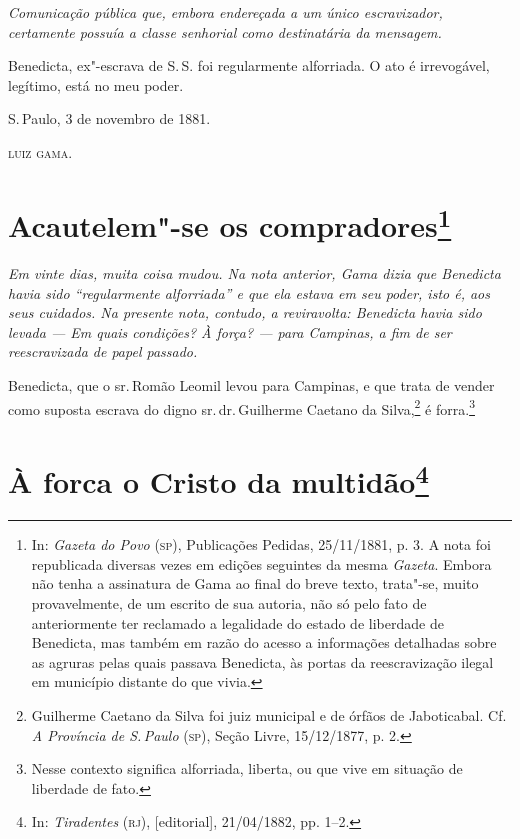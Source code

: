\begin{flushleft}
{\footnotesize\itshape
Comunicação pública que, embora endereçada a um único
escravizador, certamente possuía a classe senhorial como destinatária da
mensagem.}
\end{flushleft}

Benedicta, ex"-escrava de S.\,S. foi regularmente alforriada. O ato é
irrevogável, legítimo, está no meu poder.

S.\,Paulo, 3 de novembro de 1881.

\textsc{luiz gama.}


\chapter{Acautelem"-se os compradores\footnote[*]{In: \emph{Gazeta do Povo} (\textsc{sp}), Publicações
  Pedidas, 25/11/1881, p. 3. A nota foi republicada diversas vezes em
  edições seguintes da mesma \emph{Gazeta}. Embora não tenha a
  assinatura de Gama ao final do breve texto, trata"-se, muito
  provavelmente, de um escrito de sua autoria, não só pelo fato de
  anteriormente ter reclamado a legalidade do estado de liberdade de
  Benedicta, mas também em razão do acesso a informações detalhadas
  sobre as agruras pelas quais passava Benedicta, às portas da
  reescravização ilegal em município distante do que vivia.}}

\begin{flushleft}
{\footnotesize\itshape
Em vinte dias, muita coisa mudou. Na nota anterior, Gama dizia que
Benedicta havia sido ``regularmente alforriada'' e que ela estava em seu
poder, isto é, aos seus cuidados. Na presente nota, contudo, a
reviravolta: Benedicta havia sido levada --- Em quais condições? À força?
--- para Campinas, a fim de ser reescravizada de papel passado.}
\end{flushleft}

Benedicta, que o sr.\,Romão Leomil levou para Campinas, e que trata de
vender como suposta escrava do digno sr.\,dr.\,Guilherme Caetano da
Silva,\footnote{Guilherme Caetano da Silva foi juiz municipal e de
  órfãos de Jaboticabal. Cf. \emph{A Província de S.\,Paulo} (\textsc{sp}), Seção
  Livre, 15/12/1877, p. 2.} é forra.\footnote{Nesse contexto significa
  alforriada, liberta, ou que vive em situação de liberdade de fato.}

\chapter{À forca o Cristo da multidão\footnote[*]{In:
  \emph{Tiradentes} (\textsc{rj}), {[}editorial{]}, 21/04/1882, pp. 1--2.}}


